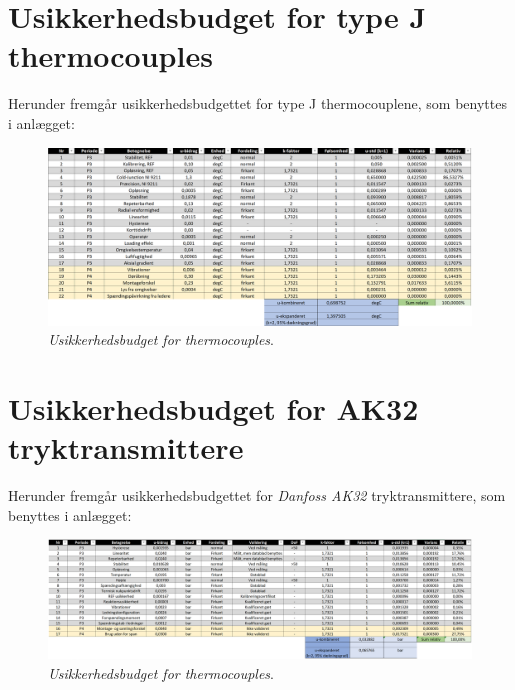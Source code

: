\documentclass[Hovedrapport.tex]{subfiles}
\begin{document}
\section{Usikkerhedsbudget for type J thermocouples}
    \label{sec:ubudget_temp}
Herunder fremgår usikkerhedsbudgettet for type J thermocouplene, som benyttes i anlægget:
\begin{figure}[H]
	\centering
	\includegraphics[width=1.0\textwidth]{Billeder/ubudget_temp_endelig.PNG}
	\caption{\textit{Usikkerhedsbudget for thermocouples}.}
	\label{fig:ubudget_temp_endelig}
\end{figure}


\section{Usikkerhedsbudget for AK32 tryktransmittere}
    \label{sec:ubudget_tryk}
Herunder fremgår usikkerhedsbudgettet for \textit{Danfoss AK32} tryktransmittere, som benyttes i anlægget:
\begin{figure}[H]
	\centering
	\includegraphics[width=1.0\textwidth]{Billeder/ubudget_tryk_endelig.PNG}
	\caption{\textit{Usikkerhedsbudget for thermocouples}.}
	\label{fig:ubudget_temp_endelig}
\end{figure}
\newpage

\end{document}
